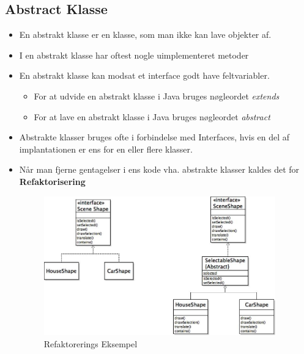 \documentclass{article}
\begin{document}
\subsection{Abstract Klasse}
\begin{itemize}
	\item En abstrakt klasse er en klasse, som man ikke kan lave objekter af.
	\item I en abstrakt klasse har oftest nogle uimplementeret metoder 
	\item En abstrakt klasse kan modsat et interface godt have feltvariabler. 
	\begin{itemize}
		\item For at udvide en abstrakt klasse i Java bruges nøgleordet \textit{extends}
		\item For at lave en abstrakt klasse i Java bruges nøgleordet \textit{abstract} 
	\end{itemize}
	\item Abstrakte klasser bruges ofte i forbindelse med Interfaces, hvis en del af implantationen er ens for en eller flere klasser.
	\item Når man fjerne gentagelser i ens kode vha. abstrakte klasser kaldes det for \textbf{Refaktorisering}
	\begin{figure}[ht!]
		\centering
		\includegraphics[width=100mm]{img/UMLabstract.jpeg}
		\caption{Refaktorerings Eksempel  \label{UMLAbstract1}}
	\end{figure}
\end{itemize}
\end{document}
